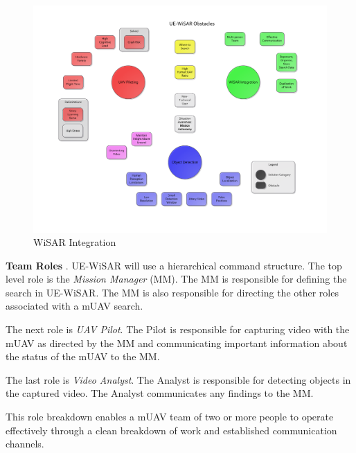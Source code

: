 \begin{figure}[htp]
	\vspace{-90pt}
	\hspace{-80pt}
	\includegraphics[keepaspectratio=true, width=\paperheight,
	height=\paperheight, page=2, angle=90, scale=0.95,
	trim=10 0 10 0]{obstacle_solution_map.pdf}
	\caption{WiSAR Integration}
	\label{fig:wisarintegrationmap}
\end{figure}

\textbf{Team Roles} \cite{goodrich2008supporting,adams2009cognitive,goodrich2007using}.  UE-WiSAR will use a hierarchical command structure.
The top level role is the \emph{Mission Manager} (MM).  The MM is responsible
for defining the search in UE-WiSAR.  The MM is also responsible for directing
the other roles associated with a mUAV search.

The next role is \emph{UAV Pilot}.  The Pilot is responsible for capturing video with the
mUAV as directed by the MM and communicating important information about the
status of the mUAV to the MM.  

The last role is \emph{Video Analyst}.  The
Analyst is responsible for detecting objects in the captured video.
The Analyst communicates any findings to the MM.  

This role breakdown enables a
mUAV team of two or more people to operate effectively through a clean breakdown
of work and established communication channels.

